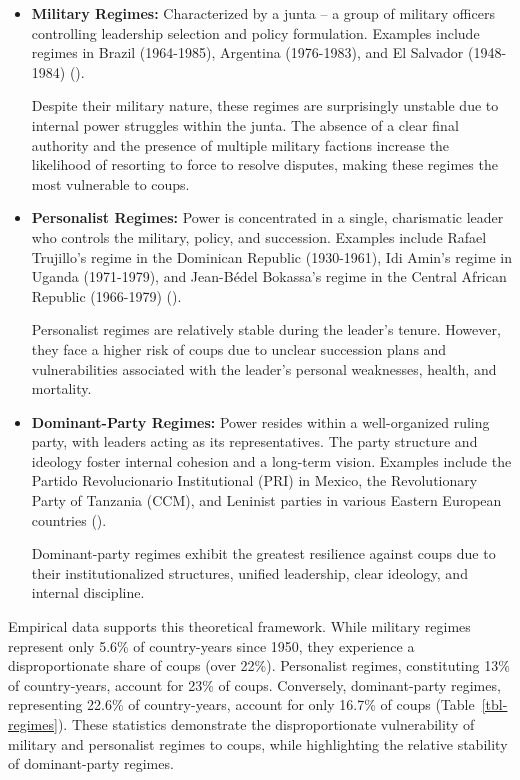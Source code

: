 \documentclass[
  12pt,
]{report}
\begin{document}
\begin{itemize}
\item
  \textbf{Military Regimes:} Characterized by a junta -- a group of
  military officers controlling leadership selection and policy
  formulation. Examples include regimes in Brazil (1964-1985), Argentina
  (1976-1983), and El Salvador (1948-1984)
  ().

  Despite their military nature, these regimes are surprisingly unstable
  due to internal power struggles within the junta. The absence of a
  clear final authority and the presence of multiple military factions
  increase the likelihood of resorting to force to resolve disputes,
  making these regimes the most vulnerable to coups.
\item
  \textbf{Personalist Regimes:} Power is concentrated in a single,
  charismatic leader who controls the military, policy, and succession.
  Examples include Rafael Trujillo's regime in the Dominican Republic
  (1930-1961), Idi Amin's regime in Uganda (1971-1979), and Jean-Bédel
  Bokassa's regime in the Central African Republic (1966-1979)
  ().

  Personalist regimes are relatively stable during the leader's tenure.
  However, they face a higher risk of coups due to unclear succession
  plans and vulnerabilities associated with the leader's personal
  weaknesses, health, and mortality.
\item
  \textbf{Dominant-Party Regimes:} Power resides within a well-organized
  ruling party, with leaders acting as its representatives. The party
  structure and ideology foster internal cohesion and a long-term
  vision. Examples include the Partido Revolucionario Institutional
  (PRI) in Mexico, the Revolutionary Party of Tanzania (CCM), and
  Leninist parties in various Eastern European countries
  ().

  Dominant-party regimes exhibit the greatest resilience against coups
  due to their institutionalized structures, unified leadership, clear
  ideology, and internal discipline.
\end{itemize}

Empirical data supports this theoretical framework. While military
regimes represent only 5.6\% of country-years since 1950, they
experience a disproportionate share of coups (over 22\%). Personalist
regimes, constituting 13\% of country-years, account for 23\% of coups.
Conversely, dominant-party regimes, representing 22.6\% of
country-years, account for only 16.7\% of coups
(Table~\ref{tbl-regimes}). These statistics demonstrate the
disproportionate vulnerability of military and personalist regimes to
coups, while highlighting the relative stability of dominant-party
regimes.
\end{document}
